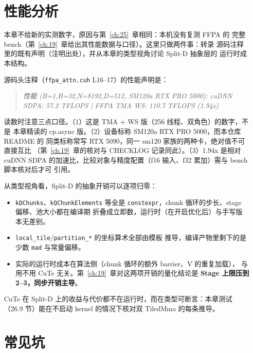 \section{性能分析}

本章不给新的实测数字，原因与第~\ref{ch:25}~章相同：本机没有复测 FFPA 的
完整 bench（第~\ref{ch:19}~章给出其性能数据与口径）。这里只做两件事：转录
源码注释里的既有声明（注明出处），并从本章的类型视角讨论 Split-D 抽象层的
运行时成本结构。

源码头注释（\texttt{ffpa\_\allowbreak{}attn.\allowbreak{}cuh} L16--17）的性能声明是：

\begin{quote}
  \textit{性能 (B=1,H=32,N=8192,D=512, SM120a RTX PRO 5000):
  cuDNN SDPA: 57.2 TFLOPS | FFPA TMA WS: 110.7 TFLOPS (1.94x)}
\end{quote}

读数时注意三点口径。（1）这是 TMA + WS 版（256 线程、双角色）的数字，不是
本章精读的 cp.async 版。（2）设备标称 SM120a RTX PRO 5000，而本仓库 README 的
同类标称常写 RTX 5090，同一 sm120 家族的两种卡，绝对值不可直接互比
（第~\ref{ch:19}~章的核对与 CHECKLOG 记录同此）。（3）1.94x 是相对 cuDNN SDPA
的加速比，比较对象与精度配置（f16 输入、f32 累加）需与 bench 脚本核对后才可
引用。

从类型视角看，Split-D 的抽象开销可以逐项归零：

\begin{itemize}[itemsep=2pt,topsep=2pt]
  \item \texttt{kDChunks}、\texttt{k\allowbreak{}QChunk\allowbreak{}Elements} 等全是
        \texttt{constexpr}，chunk 循环的步长、stage 偏移、池大小都在编译期
        折叠成立即数，运行时（在开启优化后）与手写版本无差别。
  \item \texttt{local\_tile}/\texttt{partition\_*} 的坐标算术全部由模板
        推导，编译产物里剩下的是少数 \texttt{mad} 与常量偏移。
  \item 实际的运行时成本在算法侧（chunk 循环的额外 barrier、V 的重复加载），
        与用不用 CuTe 无关。第~\ref{ch:19}~章对这两项开销的量化结论是
        \textbf{Stage 上限压到 2--3，同步开销主导}。
\end{itemize}

CuTe 在 Split-D 上的收益与代价都不在运行时，而在类型可断言：本章测试
（26.9 节）能在不启动 kernel 的情况下核对双 TiledMma 的每条推导。

\section{常见坑}

